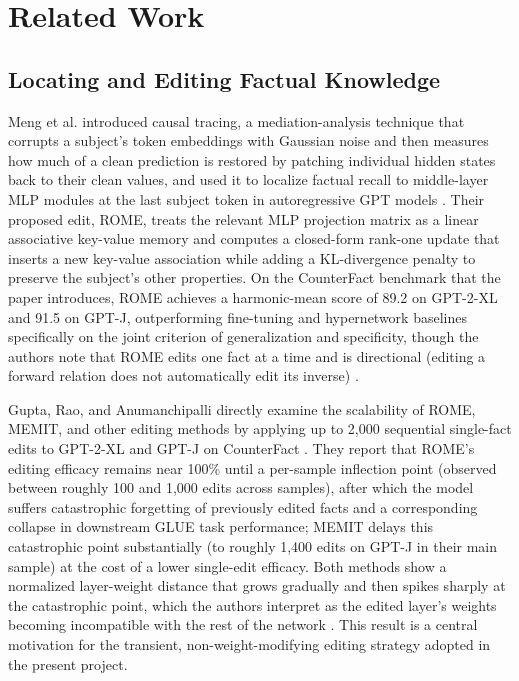 \documentclass[conference]{IEEEtran}
\begin{document}
\section{Related Work}

\subsection{Locating and Editing Factual Knowledge}

Meng et al. introduced causal tracing, a mediation-analysis technique that corrupts a subject's token embeddings with Gaussian noise and then measures how much of a clean prediction is restored by patching individual hidden states back to their clean values, and used it to localize factual recall to middle-layer MLP modules at the last subject token in autoregressive GPT models \cite{meng2022rome}. Their proposed edit, ROME, treats the relevant MLP projection matrix as a linear associative key-value memory and computes a closed-form rank-one update that inserts a new key-value association while adding a KL-divergence penalty to preserve the subject's other properties. On the CounterFact benchmark that the paper introduces, ROME achieves a harmonic-mean score of 89.2 on GPT-2-XL and 91.5 on GPT-J, outperforming fine-tuning and hypernetwork baselines specifically on the joint criterion of generalization and specificity, though the authors note that ROME edits one fact at a time and is directional (editing a forward relation does not automatically edit its inverse) \cite{meng2022rome}.

Gupta, Rao, and Anumanchipalli directly examine the scalability of ROME, MEMIT, and other editing methods by applying up to 2,000 sequential single-fact edits to GPT-2-XL and GPT-J on CounterFact \cite{gupta2024forgetting}. They report that ROME's editing efficacy remains near 100\% until a per-sample inflection point (observed between roughly 100 and 1,000 edits across samples), after which the model suffers catastrophic forgetting of previously edited facts and a corresponding collapse in downstream GLUE task performance; MEMIT delays this catastrophic point substantially (to roughly 1,400 edits on GPT-J in their main sample) at the cost of a lower single-edit efficacy. Both methods show a normalized layer-weight distance that grows gradually and then spikes sharply at the catastrophic point, which the authors interpret as the edited layer's weights becoming incompatible with the rest of the network \cite{gupta2024forgetting}. This result is a central motivation for the transient, non-weight-modifying editing strategy adopted in the present project.
\end{document}
